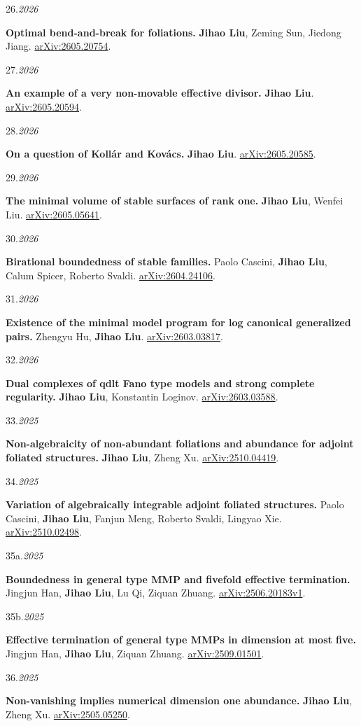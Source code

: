 \documentclass[11pt]{article}
\newlength{\datewidth}
\newcommand{\pubitem}[3]{%
  \noindent
  \begin{minipage}[t]{\datewidth}
    \raggedright\small\color{muted}#1.\;\textit{#2}
  \end{minipage}%
  \hfill%
  \begin{minipage}[t]{\dimexpr\linewidth-\datewidth-0.1in\relax}
    \raggedright #3
  \end{minipage}\par\vspace{4pt}
}
\newcommand{\paper}[1]{\textbf{#1}}
\newcommand{\me}{\textbf{Jihao Liu}}
\begin{document}
\pubitem{26}{2026}{%
  \paper{Optimal bend-and-break for foliations.}
  \me, Zeming Sun, Jiedong Jiang.
  \href{https://arxiv.org/abs/2605.20754}{arXiv:2605.20754}.}


\pubitem{27}{2026}{%
  \paper{An example of a very non-movable effective divisor.}
  \me.
  \href{https://arxiv.org/abs/2605.20594}{arXiv:2605.20594}.}


\pubitem{28}{2026}{%
  \paper{On a question of Kollár and Kovács.}
  \me.
  \href{https://arxiv.org/abs/2605.20585}{arXiv:2605.20585}.}


\pubitem{29}{2026}{%
  \paper{The minimal volume of stable surfaces of rank one.}
  \me, Wenfei Liu.
  \href{https://arxiv.org/abs/2605.05641}{arXiv:2605.05641}.}


\pubitem{30}{2026}{%
  \paper{Birational boundedness of stable families.}
  Paolo Cascini, \me, Calum Spicer, Roberto Svaldi.
  \href{https://arxiv.org/abs/2604.24106}{arXiv:2604.24106}.}


\pubitem{31}{2026}{%
  \paper{Existence of the minimal model program for log canonical generalized pairs.}
  Zhengyu Hu, \me.
  \href{https://arxiv.org/abs/2603.03817}{arXiv:2603.03817}.}


\pubitem{32}{2026}{%
  \paper{Dual complexes of qdlt Fano type models and strong complete regularity.}
  \me, Konstantin Loginov.
  \href{https://arxiv.org/abs/2603.03588}{arXiv:2603.03588}.}


\pubitem{33}{2025}{%
  \paper{Non-algebraicity of non-abundant foliations and abundance for adjoint foliated structures.}
  \me, Zheng Xu.
  \href{https://arxiv.org/abs/2510.04419}{arXiv:2510.04419}.}


\pubitem{34}{2025}{%
  \paper{Variation of algebraically integrable adjoint foliated structures.}
  Paolo Cascini, \me, Fanjun Meng, Roberto Svaldi, Lingyao Xie.
  \href{https://arxiv.org/abs/2510.02498}{arXiv:2510.02498}.}


\pubitem{35a}{2025}{%
  \paper{Boundedness in general type MMP and fivefold effective termination.}
  Jingjun Han, \me, Lu Qi, Ziquan Zhuang.
  \href{https://arxiv.org/abs/2506.20183v1}{arXiv:2506.20183v1}.}


\pubitem{35b}{2025}{%
  \paper{Effective termination of general type MMPs in dimension at most five.}
  Jingjun Han, \me, Ziquan Zhuang.
  \href{https://arxiv.org/abs/2509.01501}{arXiv:2509.01501}.}


\pubitem{36}{2025}{%
  \paper{Non-vanishing implies numerical dimension one abundance.}
  \me, Zheng Xu.
  \href{https://arxiv.org/abs/2505.05250}{arXiv:2505.05250}.}
\end{document}
